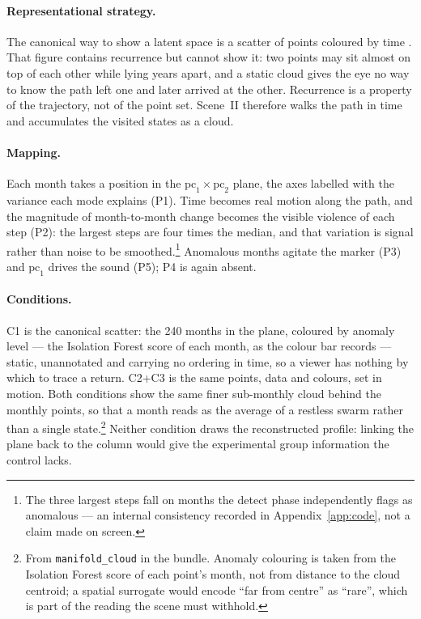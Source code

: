 \paragraph{Representational strategy.} The canonical way to show a latent space is a scatter of points coloured by time \parencite{sacha2018}. That figure contains recurrence but cannot show it: two points may sit almost on top of each other while lying years apart, and a static cloud gives the eye no way to know the path left one and later arrived at the other. Recurrence is a property of the trajectory, not of the point set. Scene~II therefore walks the path in time and accumulates the visited states as a cloud.

\paragraph{Mapping.} Each month takes a position in the $\mathrm{pc}_1 \times \mathrm{pc}_2$ plane, the axes labelled with the variance each mode explains (P1). Time becomes real motion along the path, and the magnitude of month-to-month change becomes the visible violence of each step (P2): the largest steps are four times the median, and that variation is signal rather than noise to be smoothed.\footnote{The three largest steps fall on months the detect phase independently flags as anomalous --- an internal consistency recorded in Appendix~\ref{app:code}, not a claim made on screen.} Anomalous months agitate the marker (P3) and $\mathrm{pc}_1$ drives the sound (P5); P4 is again absent.

\paragraph{Conditions.} C1 is the canonical scatter: the 240 months in the plane, coloured by anomaly level --- the Isolation Forest score of each month, as the colour bar records --- static, unannotated and carrying no ordering in time, so a viewer has nothing by which to trace a return. C2+C3 is the same points, data and colours, set in motion. Both conditions show the same finer sub-monthly cloud behind the monthly points, so that a month reads as the average of a restless swarm rather than a single state.\footnote{From \texttt{manifold\_cloud} in the bundle. Anomaly colouring is taken from the Isolation Forest score of each point's month, not from distance to the cloud centroid; a spatial surrogate would encode ``far from centre'' as ``rare'', which is part of the reading the scene must withhold.} Neither condition draws the reconstructed profile: linking the plane back to the column would give the experimental group information the control lacks.

